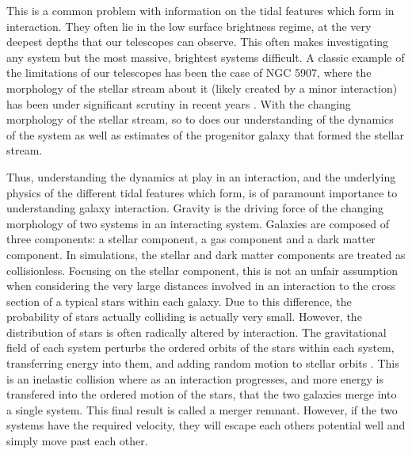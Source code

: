 This is a common problem with information on the tidal features which form in interaction. They often lie in the low surface brightness regime, at the very deepest depths that our telescopes can observe. This often makes investigating any system but the most massive, brightest systems difficult. A classic example of the limitations of our telescopes has been the case of NGC 5907, where the morphology of the stellar stream about it (likely created by a minor interaction) has been under significant scrutiny in recent years \citep{If this paragraph remains here, cite the different NGC 5907 papers}. With the changing morphology of the stellar stream, so to does our understanding of the dynamics of the system as well as estimates of the progenitor galaxy that formed the stellar stream. 

Thus, understanding the dynamics at play in an interaction, and the underlying physics of the different tidal features which form, is of paramount importance to understanding galaxy interaction. Gravity is the driving force of the changing morphology of two systems in an interacting system. Galaxies are composed of three components: a stellar component, a gas component and a dark matter component. In simulations, the stellar and dark matter components are treated as collisionless. Focusing on the stellar component, this is not an unfair assumption when considering the very large distances involved in an interaction to the cross section of a typical stars within each galaxy. Due to this difference, the probability of stars actually colliding is actually very small. However, the distribution of stars is often radically altered by interaction. The gravitational field of each system perturbs the ordered orbits of the stars within each system, transferring energy into them, and adding random motion to stellar orbits \citep{Holmberg 1941 or Alladin 1965}. This is an inelastic collision where as an interaction progresses, and more energy is transfered into the ordered motion of the stars, that the two galaxies merge into a single system. This final result is called a merger remnant. However, if the two systems have the required velocity, they will escape each others potential well and simply move past each other.

